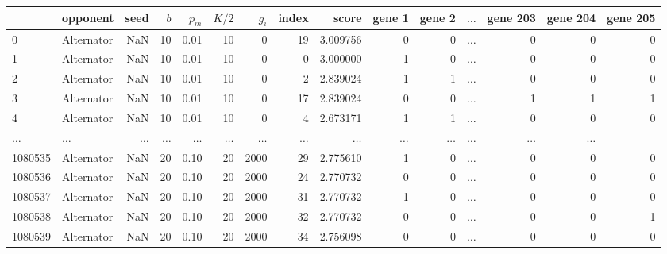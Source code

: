 \begin{tabular}{llrrrrrrrrrrrrr}
\toprule
{} &    opponent &  seed &  $b$ &  $p_m$ &  $K/2$ &  $g_i$ &  index &     score &  gene 1 &  gene 2 &  \(\dots\) &   gene 203 &  gene 204 &  gene 205 \\
\midrule
0       &  Alternator &   NaN &   10 &   0.01 &     10 &      0 &     19 &  3.009756 &       0 &       0  & \(\dots\) &      0 &         0 &         0 \\
1       &  Alternator &   NaN &   10 &   0.01 &     10 &      0 &      0 &  3.000000 &       1 &       0  & \(\dots\) &      0 &         0 &         0 \\
2       &  Alternator &   NaN &   10 &   0.01 &     10 &      0 &      2 &  2.839024 &       1 &       1  & \(\dots\) &      0 &         0 &         0 \\
3       &  Alternator &   NaN &   10 &   0.01 &     10 &      0 &     17 &  2.839024 &       0 &       0  & \(\dots\) &      1 &         1 &         1 \\
4       &  Alternator &   NaN &   10 &   0.01 &     10 &      0 &      4 &  2.673171 &       1 &       1  & \(\dots\) &      0 &         0 &         0 \\
\(\dots\)  &  \(\dots\)  &   \(\dots\)  &   \(\dots\)  & \(\dots\)  &  \(\dots\)  & \(\dots\)          & \(\dots\) &       \(\dots\)  &       \(\dots\)  &  \(\dots\)    & \(\dots\)  &         \(\dots\)  &         \(\dots\)  \\
1080535 &  Alternator &   NaN &   20 &   0.10 &     20 &   2000 &     29 &  2.775610 &       1 &       0  & \(\dots\) &      0 &         0 &         0 \\
1080536 &  Alternator &   NaN &   20 &   0.10 &     20 &   2000 &     24 &  2.770732 &       0 &       0  & \(\dots\) &      0 &         0 &         0 \\
1080537 &  Alternator &   NaN &   20 &   0.10 &     20 &   2000 &     31 &  2.770732 &       1 &       0  & \(\dots\) &      0 &         0 &         0 \\
1080538 &  Alternator &   NaN &   20 &   0.10 &     20 &   2000 &     32 &  2.770732 &       0 &       0  & \(\dots\) &      0 &         0 &         1 \\
1080539 &  Alternator &   NaN &   20 &   0.10 &     20 &   2000 &     34 &  2.756098 &       0 &       0  & \(\dots\) &      0 &         0 &         0 \\
\bottomrule
\end{tabular}
